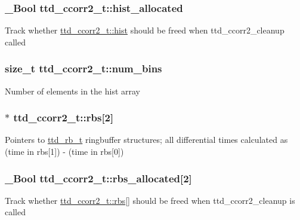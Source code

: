 \subsubsection[{hist\+\_\+allocated}]{\setlength{\rightskip}{0pt plus 5cm}\+\_\+\+Bool ttd\+\_\+ccorr2\+\_\+t\+::hist\+\_\+allocated}\label{structttd__ccorr2__t_a171c849ac19bc37d49c0d6de41d64057}
Track whether \hyperlink{structttd__ccorr2__t_a6670bb2f511309d52c6c0cf9ccc9cf43}{ttd\+\_\+ccorr2\+\_\+t\+::hist} should be freed when ttd\+\_\+ccorr2\+\_\+cleanup called \hypertarget{structttd__ccorr2__t_a811a546cf1b2cf24a6c907c4917932ef}{}
\subsubsection[{num\+\_\+bins}]{\setlength{\rightskip}{0pt plus 5cm}size\+\_\+t ttd\+\_\+ccorr2\+\_\+t\+::num\+\_\+bins}\label{structttd__ccorr2__t_a811a546cf1b2cf24a6c907c4917932ef}
Number of elements in the {\ttfamily hist} array \hypertarget{structttd__ccorr2__t_aa64b2c0039a6466a4d15e18e1d4e22cf}{}
\subsubsection[{rbs}]{$\ast$ ttd\+\_\+ccorr2\+\_\+t\+::rbs\mbox{[}2\mbox{]}}\label{structttd__ccorr2__t_aa64b2c0039a6466a4d15e18e1d4e22cf}
Pointers to \hyperlink{structttd__rb__t}{ttd\+\_\+rb\+\_\+t} ringbuffer structures; all differential times calculated as (time in rbs\mbox{[}1\mbox{]}) -\/ (time in rbs\mbox{[}0\mbox{]}) \hypertarget{structttd__ccorr2__t_a929ec0473292ca0d1826513116842207}{}
\subsubsection[{rbs\+\_\+allocated}]{\setlength{\rightskip}{0pt plus 5cm}\+\_\+\+Bool ttd\+\_\+ccorr2\+\_\+t\+::rbs\+\_\+allocated\mbox{[}2\mbox{]}}\label{structttd__ccorr2__t_a929ec0473292ca0d1826513116842207}
Track whether \hyperlink{structttd__ccorr2__t_aa64b2c0039a6466a4d15e18e1d4e22cf}{ttd\+\_\+ccorr2\+\_\+t\+::rbs}\mbox{[}\mbox{]} should be freed when ttd\+\_\+ccorr2\+\_\+cleanup is called \hypertarget{structttd__ccorr2__t_a8413d9d1551e1fafbaf6d168ca997b0c}{}

